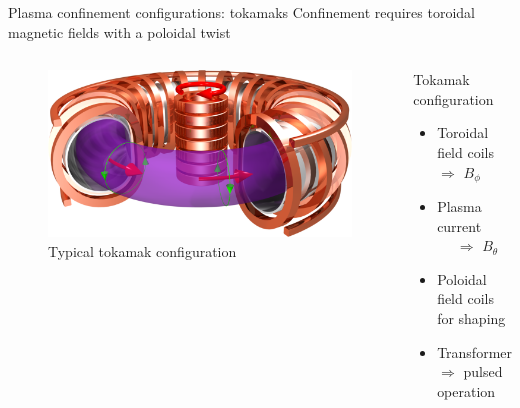 \documentclass{beamer}
\begin{document}
\begin{frame}{Plasma confinement configurations: tokamaks}
 Confinement requires toroidal magnetic fields with a poloidal twist
\begin{columns}
    \begin{figure} 
    \includegraphics[width=\textwidth]{graphics/7_Tokamak3D_41}
    \caption{Typical tokamak configuration}
    \end{figure}

    \begin{block}{Tokamak configuration}
      \begin{itemize}
        \item Toroidal field coils $\Rightarrow$ $B_{\phi}$
        \item Plasma current $\quad \,\,\Rightarrow$ $B_{\theta}$
        \item Poloidal field coils for shaping
        \item Transformer $\Rightarrow$ pulsed operation
      \end{itemize}
    \end{block}
  \end{columns}



\end{frame}

\end{document}
